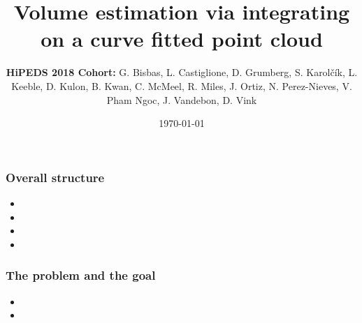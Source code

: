\documentclass{beamer}
\title[Short title]{Volume estimation via integrating on a curve fitted point cloud} %
\author{\textbf{HiPEDS 2018 Cohort:} G. Bisbas, L. Castiglione, D. Grumberg, S. Karolčík, L. Keeble, D. Kulon, B. Kwan, C. McMeel, R. Miles, J. Ortiz, N. Perez-Nieves, V. Pham Ngoc, J. Vandebon, D. Vink} %
\institute[Imperial College London] %
{ Imperial College London \\add logos %
\medskip %
}
\date{\today} %
\begin{document}
\begin{frame}
\titlepage %
\end{frame}




\begin{frame}
\frametitle{Overall structure}

\begin{itemize}
	\item  
	\item 
	\item 
	\item 
	

	
	
\end{itemize}

\end{frame}


\begin{frame}
\frametitle{The problem and the goal} 

\begin{itemize}
	\item
	
	\item 
	
\end{itemize}

\end{frame}
\end{document}
